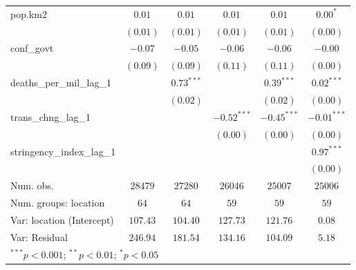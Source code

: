\documentclass[
  11pt,
]{article}
\begin{document}
\begin{table}
\begin{center}
\begin{tabular}{l c c c c c}
pop.km2                   & $0.01$       & $0.01$       & $0.01$        & $0.01$        & $0.00^{*}$    \\
                          & $(0.01)$     & $(0.01)$     & $(0.01)$      & $(0.01)$      & $(0.00)$      \\
conf\_govt                & $-0.07$      & $-0.05$      & $-0.06$       & $-0.06$       & $-0.00$       \\
                          & $(0.09)$     & $(0.09)$     & $(0.11)$      & $(0.11)$      & $(0.00)$      \\
deaths\_per\_mil\_lag\_1  &              & $0.73^{***}$ &               & $0.39^{***}$  & $0.02^{***}$  \\
                          &              & $(0.02)$     &               & $(0.02)$      & $(0.00)$      \\
trans\_chng\_lag\_1       &              &              & $-0.52^{***}$ & $-0.45^{***}$ & $-0.01^{***}$ \\
                          &              &              & $(0.00)$      & $(0.00)$      & $(0.00)$      \\
stringency\_index\_lag\_1 &              &              &               &               & $0.97^{***}$  \\
                          &              &              &               &               & $(0.00)$      \\
\hline
Num. obs.                 & $28479$      & $27280$      & $26046$       & $25007$       & $25006$       \\
Num. groups: location     & $64$         & $64$         & $59$          & $59$          & $59$          \\
Var: location (Intercept) & $107.43$     & $104.40$     & $127.73$      & $121.76$      & $0.08$        \\
Var: Residual             & $246.94$     & $181.54$     & $134.16$      & $104.09$      & $5.18$        \\
\hline
\multicolumn{6}{l}{\scriptsize{$^{***}p<0.001$; $^{**}p<0.01$; $^{*}p<0.05$}}
\end{tabular}
\label{tab:addit}
\end{center}
\end{table}
\end{document}
